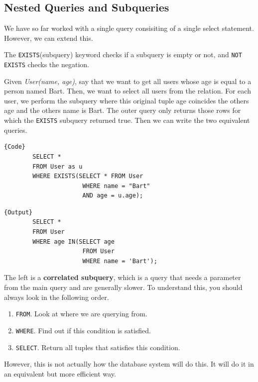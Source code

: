 \documentclass{article}
\begin{document}
  \subsection{Nested Queries and Subqueries} 

    We have so far worked with a single query consisiting of a single select statement. However, we can extend this. 

    \begin{definition}
      The \texttt{EXISTS}(subquery) keyword checks if a subquery is empty or not, and \texttt{NOT EXISTS} checks the negation. 
    \end{definition}

    \begin{example}[Ages]
      Given \textit{User(name, age)}, say that we want to get all users whose age is equal to a person named Bart. Then, we want to select all users from the relation. For each user, we perform the subquery where this original tuple age coincides the others age and the others name is Bart. The outer query only returns those rows for which the \texttt{EXISTS} subquery returned true. Then we can write the two equivalent queries. 

      \noindent\begin{minipage}{.5\textwidth}
      \begin{lstlisting}[]{Code}
        SELECT * 
        FROM User as u
        WHERE EXISTS(SELECT * FROM User
                      WHERE name = "Bart" 
                      AND age = u.age); 
      \end{lstlisting}
      \end{minipage}
      \hfill
      \begin{minipage}{.49\textwidth}
      \begin{lstlisting}[]{Output}
        SELECT * 
        FROM User 
        WHERE age IN(SELECT age 
                      FROM User 
                      WHERE name = 'Bart'); 
      \end{lstlisting}
      \end{minipage}

      The left is a \textbf{correlated subquery}, which is a query that needs a parameter from the main query and are generally slower. To understand this, you should always look in the following order. 
      \begin{enumerate}
        \item \texttt{FROM}. Look at where we are querying from. 
        \item \texttt{WHERE}. Find out if this condition is satisfied. 
        \item \texttt{SELECT}. Return all tuples that satisfies this condition. 
      \end{enumerate}
      However, this is not actually how the database system will do this. It will do it in an equivalent but more efficient way. 
    \end{example}
\end{document}
